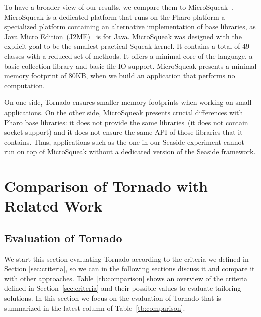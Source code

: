 To have a broader view of our results, we compare them to MicroSqueak~\cite{Malo11a}. MicroSqueak is a dedicated platform that runs on the Pharo platform \ie a specialized platform containing an alternative implementation of base libraries, as Java Micro Edition~(J2ME)~\cite{JavaME} is for Java. MicroSqueak was designed with the explicit goal to be the smallest practical Squeak kernel. It contains a total of 49 classes with a reduced set of methods. It offers a minimal core of the language, a basic collection library and basic file IO support. MicroSqueak presents a minimal memory footprint of 80KB, when we build an application that performs no computation.

On one side, Tornado ensures smaller memory footprints when working on small applications. On the other side, MicroSqueak presents crucial differences with Pharo base libraries: it does not provide the same libraries~(\eg it does not contain socket support) and it does not ensure the same API of those libraries that it contains. Thus, applications such as the one in our Seaside experiment cannot run on top of MicroSqueak without a dedicated version of the Seaside framework.

\section{Comparison of Tornado with Related Work} \label{sec:related_work}



\subsection{Evaluation of Tornado}

We start this section evaluating Tornado according to the criteria we defined in Section \ref{sec:criteria}, so we can in the following sections discuss it and compare it with other approaches. Table~\ref{tb:comparison} shows an overview of the criteria defined in Section~\ref{sec:criteria} and their possible values to evaluate tailoring solutions.
In this section we focus on the evaluation of Tornado that is summarized in the latest column of Table~\ref{tb:comparison}.

\belowrulesep=0pt
\aboverulesep=0pt

